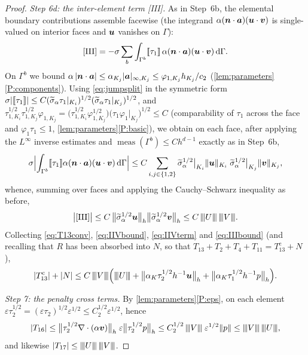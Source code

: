 \begin{proof}
\smallskip\noindent\emph{Step 6d: the inter-element term \textup{[III]}.}
As in Step~6b, the elemental boundary contributions assemble facewise (the integrand
$\alpha(\boldsymbol{n}\cdot\boldsymbol{a})(\boldsymbol{u}\cdot\boldsymbol{v})$ is single-valued on interior faces and $\boldsymbol{u}$ vanishes
on $\Gamma$):
\begin{equation*}
  \textup{[III]}
  = -\sigma\sum_b\int_{\Gamma^b}[\![\tau_1]\!]\,
  \alpha(\boldsymbol{n}\cdot\boldsymbol{a})(\boldsymbol{u}\cdot\boldsymbol{v})\,\mathrm{d}\Gamma .
\end{equation*}
On $\Gamma^b$ we bound $\alpha\,|\boldsymbol{n}\cdot\boldsymbol{a}|\le\alpha_{K_j}|\boldsymbol{a}|_{\infty,K_j}
\le\varphi_{1,K_j}h_{K_j}/c_2$ (\cref{lem:parameters}\ref{P:components}). Using
\eqref{eq:jumpsplit} in the symmetric form
$\sigma|[\![\tau_1]\!]|\le C(\widetilde{\sigma}_{\alpha}\tau_1|_{K_i})^{1/2}
(\widetilde{\sigma}_{\alpha}\tau_1|_{K_j})^{1/2}$, and
$\tau_{1,K_i}^{1/2}\tau_{1,K_j}^{1/2}\varphi_{1,K_j}
=\bigl(\tau_{1,K_i}^{1/2}\varphi_{1,K_j}^{1/2}\bigr)
\bigl(\tau_1\varphi_1|_{K_j}\bigr)^{1/2}\le C$ (comparability of $\tau_1$ across the face
and $\varphi_1\tau_1\le1$, \cref{lem:parameters}\ref{P:basic}), we obtain on each face, after applying the $L^\infty$ inverse
estimates and $\operatorname{meas}(\Gamma^b)\le Ch^{d-1}$ exactly as in Step~6b,
\begin{equation}\label{eq:IIIface}
  \sigma\Bigl|\int_{\Gamma^b}[\![\tau_1]\!]\alpha(\boldsymbol{n}\cdot\boldsymbol{a})(\boldsymbol{u}\cdot\boldsymbol{v})
  \,\mathrm{d}\Gamma\Bigr|
  \le C\sum_{i,j\in\{1,2\}}
  \widetilde{\sigma}_{\alpha}^{1/2}\big|_{K_i}\lVert\boldsymbol{u}\rVert_{K_i}\;
  \widetilde{\sigma}_{\alpha}^{1/2}\big|_{K_j}\lVert\boldsymbol{v}\rVert_{K_j},
\end{equation}
whence, summing over faces and applying the Cauchy--Schwarz inequality as before,
\begin{equation}\label{eq:IIIbound}
  \bigl|\textup{[III]}\bigr|
  \le C\,\bigl\lVert\widetilde{\sigma}_{\alpha}^{1/2}\boldsymbol{u}\bigr\rVert_h
  \bigl\lVert\widetilde{\sigma}_{\alpha}^{1/2}\boldsymbol{v}\bigr\rVert_h
  \le C\,{\lvert\kern-0.25ex\lvert\kern-0.25ex\lvert U \rvert\kern-0.25ex\rvert\kern-0.25ex\rvert}\,{\lvert\kern-0.25ex\lvert\kern-0.25ex\lvert V \rvert\kern-0.25ex\rvert\kern-0.25ex\rvert}.
\end{equation}
Collecting \eqref{eq:T13conv}, \eqref{eq:IIVbound}, \eqref{eq:IIVterm} and
\eqref{eq:IIIbound} (and recalling that $R$ has been absorbed into $N$, so that
$T_{13}+T_2+T_4+T_{11}=T_{13}^{\mathrm{c}}+N$),
\begin{equation}\label{eq:groupstep}
  |T_{13}^{\mathrm{c}}| + |N|
  \le C\,{\lvert\kern-0.25ex\lvert\kern-0.25ex\lvert V \rvert\kern-0.25ex\rvert\kern-0.25ex\rvert}\Bigl({\lvert\kern-0.25ex\lvert\kern-0.25ex\lvert U \rvert\kern-0.25ex\rvert\kern-0.25ex\rvert}
  + \bigl\lVert\alpha_K\tau_2^{1/2}h^{-1}\boldsymbol{u}\bigr\rVert_h
  + \bigl\lVert\alpha_K\tau_1^{1/2}h^{-1}p\bigr\rVert_h\Bigr).
\end{equation}

\medskip\noindent\emph{Step 7: the penalty cross terms.}
By \cref{lem:parameters}\ref{P:eps}, on each element
$\varepsilon\tau_2^{1/2}=(\varepsilon\tau_2)^{1/2}\varepsilon^{1/2}
\le C_2^{1/2}\varepsilon^{1/2}$, hence
\begin{equation}\label{eq:crosspenalty}
  |T_{16}|
  \le \bigl\lVert\tau_2^{1/2}\nabla\cdot(\alpha\boldsymbol{v})\bigr\rVert_h\;
  \varepsilon\bigl\lVert\tau_2^{1/2}p\bigr\rVert_h
  \le C_2^{1/2}\,{\lvert\kern-0.25ex\lvert\kern-0.25ex\lvert V \rvert\kern-0.25ex\rvert\kern-0.25ex\rvert}\;\varepsilon^{1/2}\lVert p\rVert
  \le {\lvert\kern-0.25ex\lvert\kern-0.25ex\lvert V \rvert\kern-0.25ex\rvert\kern-0.25ex\rvert}\,{\lvert\kern-0.25ex\lvert\kern-0.25ex\lvert U \rvert\kern-0.25ex\rvert\kern-0.25ex\rvert},
\end{equation}
and likewise $|T_{17}|\le{\lvert\kern-0.25ex\lvert\kern-0.25ex\lvert U \rvert\kern-0.25ex\rvert\kern-0.25ex\rvert}\,{\lvert\kern-0.25ex\lvert\kern-0.25ex\lvert V \rvert\kern-0.25ex\rvert\kern-0.25ex\rvert}$.


\end{proof}
